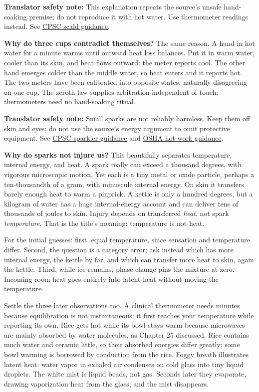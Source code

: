 \textbf{Translator safety note:} This explanation repeats the source's unsafe hand-soaking premise; do not reproduce it with hot water. Use thermometer readings instead. See \href{https://www.cpsc.gov/s3fs-public/5098.pdf}{CPSC scald guidance}.

\textbf{Why do three cups contradict themselves?} The same reason. A hand in hot water for a minute warms until outward heat loss balances. Put it in warm water, cooler than its skin, and heat flows outward: the meter reports cool. The other hand emerges colder than the middle water, so heat enters and it reports hot. The two meters have been calibrated into opposite states, naturally disagreeing on one cup. The zeroth law supplies arbitration independent of touch: thermometers need no hand-soaking ritual.

\textbf{Translator safety note:} Small sparks are not reliably harmless. Keep them off skin and eyes; do not use the source's energy argument to omit protective equipment. See \href{https://www.cpsc.gov/node/65701}{CPSC sparkler guidance} and \href{https://www.osha.gov/etools/shipyard/general-requirements/ppe/ppe-selection/hot-work}{OSHA hot-work guidance}.

\textbf{Why do sparks not injure us?} This beautifully separates temperature, internal energy, and heat. A spark really can exceed a thousand degrees, with vigorous microscopic motion. Yet each is a tiny metal or oxide particle, perhaps a ten-thousandth of a gram, with minuscule internal energy. On skin it transfers barely enough heat to warm a pinprick. A kettle is only a hundred degrees, but a kilogram of water has a huge internal-energy account and can deliver tens of thousands of joules to skin. Injury depends on transferred \emph{heat}, not spark \emph{temperature}. That is the title's meaning: temperature is not heat.

For the initial guesses: first, equal temperature, since sensation and temperature differ. Second, the question is a category error; ask instead which has more internal energy, the kettle by far, and which can transfer more heat to skin, again the kettle. Third, while ice remains, phase change pins the mixture at zero. Incoming room heat goes entirely into latent heat without moving the temperature.

Settle the three later observations too. A clinical thermometer needs minutes because equilibration is not instantaneous: it first reaches your temperature while reporting its own. Rice gets hot while its bowl stays warm because microwaves are mainly absorbed by water molecules, as Chapter 25 discussed. Rice contains much water and ceramic little, so their absorbed energies differ greatly; some bowl warming is borrowed by conduction from the rice. Foggy breath illustrates latent heat: water vapor in exhaled air condenses on cold glass into tiny liquid droplets. The white mist is liquid beads, not gas. Seconds later they evaporate, drawing vaporization heat from the glass, and the mist disappears.

